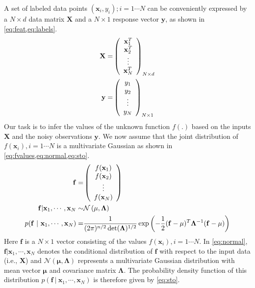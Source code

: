 A set of labeled data points ${(\mathbf{x}_i, y_i); i = 1 \cdots N}$ can be conveniently expressed 
by a $N \times d$ data matrix $\mathbf{X}$ and a $N \times 1$ response vector $\mathbf{y}$, as 
shown in \cref{eq:feat,eq:labels}.
%
\begin{align}
  \mathbf{X}  = & \left( \begin{array}{c} \mathbf{x}^{T}_1 \\ \mathbf{x}^{T}_2 \\ \vdots \\ \mathbf{x}^{T}_N \end{array} \right)_{N \times d} \label{eq:feat} \\
  \vspace{2\baselineskip}
  \mathbf{y}  = & \left( \begin{array}{c} y_1 \\ y_2 \\ \vdots \\ y_N \end{array} \right) _{N \times 1} \label{eq:labels}
\end{align}
%
Our task is to infer the values of the unknown function $f(.)$ based on the inputs $\mathbf{X}$ and 
the noisy observations $\mathbf{y}$. We now assume that the joint distribution of 
$f(\mathbf{x}_i), i = 1 \cdots N$ is a multivariate Gaussian as shown in 
\cref{eq:fvalues,eq:normal,eq:sto}.
%
\begin{align}
 \mathbf{f} = & \left( \begin{array}{c} f(\mathbf{x}_1) \\ f(\mathbf{x}_2) \\ \vdots \\ f(\mathbf{x}_N) \end{array} \right) \label{eq:fvalues}\\
 \vspace{2\baselineskip}
 \mathbf{f} | \mathbf{x}_1, \cdots, \mathbf{x}_N \sim & \mathcal{N}\left( \mathbf{\mu}, \mathbf{\Lambda} \right)  \label{eq:normal}\\
 \vspace{2\baselineskip}
 p( \mathbf{f} \ | \ \mathbf{x}_1, \cdots, \mathbf{x}_N) = & \frac{1}{(2\pi)^{n/2} \det(\mathbf{\Lambda})^{1/2}} \exp \left(-\frac{1}{2} (\mathbf{f} - \mathbf{\mu})^T \mathbf{\Lambda}^{-1} (\mathbf{f} - \mathbf{\mu}) \right) \label{eq:sto}
\end{align}
%
Here $\mathbf{f}$ is a $N\times 1$ vector consisting of the values 
$f(\mathbf{x}_i), i = 1 \cdots N$. In \cref{eq:normal}, 
$\mathbf{f}|\mathbf{x}_1, \cdots, \mathbf{x}_N$ denotes the conditional distribution of 
$\mathbf{f}$ with respect to the input data (i.e., $\mathbf{X}$) and 
$\mathcal{N}\left(\mathbf{\mu}, \mathbf{\Lambda} \right)$ represents a multivariate Gaussian 
distribution with mean vector $\mathbf{\mu}$ and covariance matrix $\mathbf{\Lambda}$. The 
probability density function of this distribution 
$p( \mathbf{f} \ | \ \mathbf{x}_1, \cdots, \mathbf{x}_N)$ is therefore given by \cref{eq:sto}.

